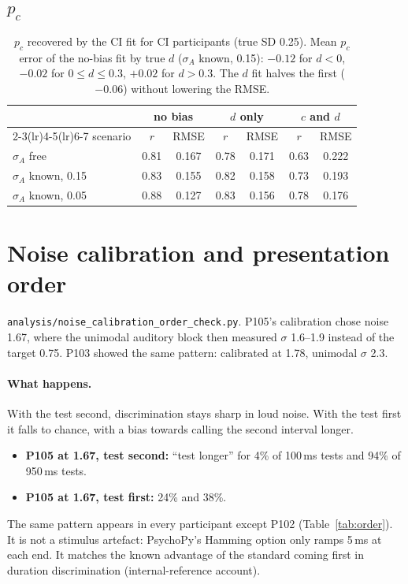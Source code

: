 \documentclass[11pt,a4paper]{article}
\newcommand{\pc}{p_c}
\begin{document}
\subsection{$\pc$}
\begin{table}[H]
\centering\small
\begin{tabular}{lcccccc}
\toprule
 & \multicolumn{2}{c}{no bias} & \multicolumn{2}{c}{$d$ only} & \multicolumn{2}{c}{$c$ and $d$} \\
\cmidrule(lr){2-3}\cmidrule(lr){4-5}\cmidrule(lr){6-7}
scenario & $r$ & RMSE & $r$ & RMSE & $r$ & RMSE \\
\midrule
$\sigma_A$ free & 0.81 & 0.167 & 0.78 & 0.171 & 0.63 & 0.222 \\
$\sigma_A$ known, 0.15 & 0.83 & 0.155 & 0.82 & 0.158 & 0.73 & 0.193 \\
$\sigma_A$ known, 0.05 & 0.88 & 0.127 & 0.83 & 0.156 & 0.78 & 0.176 \\
\bottomrule
\end{tabular}
\caption{$\pc$ recovered by the CI fit for CI participants (true SD 0.25). Mean $\pc$ error of the no-bias fit by true $d$ ($\sigma_A$ known, 0.15): $-0.12$ for $d < 0$, $-0.02$ for $0 \le d \le 0.3$, $+0.02$ for $d > 0.3$. The $d$ fit halves the first ($-0.06$) without lowering the RMSE.}
\end{table}

\section{Noise calibration and presentation order}\label{sec:order}
\texttt{analysis/noise\_calibration\_order\_check.py}. P105's calibration chose noise 1.67, where the unimodal auditory block then measured $\sigma$ 1.6--1.9 instead of the target 0.75. P103 showed the same pattern: calibrated at 1.78, unimodal $\sigma$ 2.3.

\paragraph{What happens.} With the test second, discrimination stays sharp in loud noise. With the test first it falls to chance, with a bias towards calling the second interval longer.
\begin{itemize}
\item \textbf{P105 at 1.67, test second:} ``test longer'' for 4\% of 100\,ms tests and 94\% of 950\,ms tests.
\item \textbf{P105 at 1.67, test first:} 24\% and 38\%.
\end{itemize}
The same pattern appears in every participant except P102 (Table~\ref{tab:order}). It is not a stimulus artefact: PsychoPy's Hamming option only ramps 5\,ms at each end. It matches the known advantage of the standard coming first in duration discrimination (internal-reference account).
\end{document}
